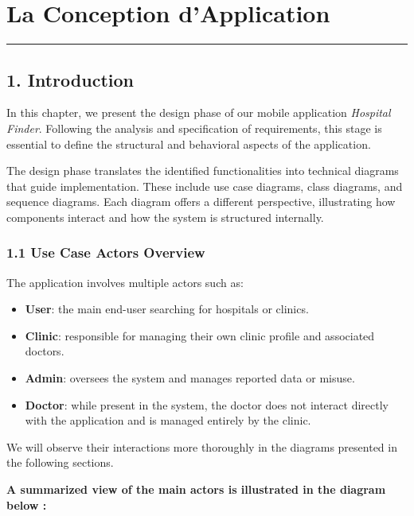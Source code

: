 \documentclass[12pt]{report}
\begin{document}
\newpage

\chapter{\textbf{La Conception d'Application}}
\rule{\linewidth}{1.5pt}


\section*{\textbf{1. Introduction}}

\noindent In this chapter, we present the design phase of our mobile application \textit{Hospital Finder}. Following the analysis and specification of requirements, this stage is essential to define the structural and behavioral aspects of the application.

\noindent The design phase translates the identified functionalities into technical diagrams that guide implementation. These include use case diagrams, class diagrams, and sequence diagrams. Each diagram offers a different perspective, illustrating how components interact and how the system is structured internally.

\subsection*{1.1 Use Case Actors Overview}

\noindent The application involves multiple actors such as:

\begin{itemize}
	\item \textbf{User}: the main end-user searching for hospitals or clinics.
	\item \textbf{Clinic}: responsible for managing their own clinic profile and associated doctors.
	\item \textbf{Admin}: oversees the system and manages reported data or misuse.
	\item \textbf{Doctor}: while present in the system, the doctor does not interact directly with the application and is managed entirely by the clinic.
\end{itemize}
\newpage
\noindent We will observe their interactions more thoroughly in the diagrams presented in the following sections.

\noindent \textbf{A summarized view of the main actors is illustrated in the diagram below :}
\end{document}

